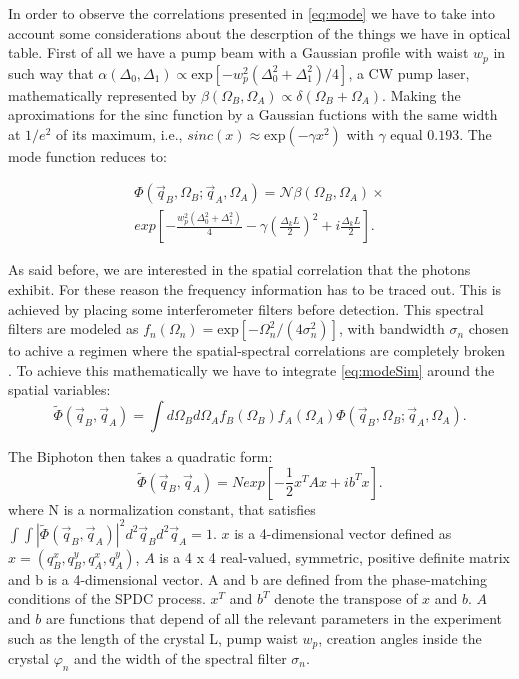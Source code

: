 In order to observe the correlations presented in \ref{eq:mode} we have to take into account some considerations about the descrption of the things we have in optical table.
First of all we have a pump beam with a Gaussian profile with waist $w_p$ 
in such way that $\alpha (\Delta_0,\Delta_1 ) \propto \text{exp}[-w_p^2 (\Delta_0^2 + \Delta_1^2 )/4]$, a CW pump laser, mathematically represented by
$\beta (\Omega_B , \Omega_A) \propto \delta(\Omega_B + \Omega_A)$. Making the aproximations for the sinc function by a Gaussian fuctions with the same width at $1/e^2$ of its maximum,
i.e., $sinc(x) \approx \text{exp}(-\gamma x^2)$ with $\gamma$ equal $0.193$.
The mode function reduces to:

\begin{equation}\label{eq:modeSim}
\begin{split}
\Phi(\vec{q}_B,\Omega_B;\vec{q}_A,\Omega_A) = \mathcal{N} \beta (\Omega_B , \Omega_A)
\times \\ \textit{exp}\left[ -\frac{w_p^2 (\Delta_0^2 + \Delta_1^2 )}{4}-\gamma \left(\frac{\Delta_k L}{2} \right)^2 + i\frac{\Delta_k L}{2} \right]  .
\end{split}
\end{equation}

As said before, we are interested in the spatial correlation that the photons 
exhibit. For these reason the frequency information has to be traced 
out. This is achieved by placing some interferometer filters before detection.
This spectral filters are modeled as $f_n (\Omega_n)=\text{exp}[-\Omega_n^2/(
4\sigma_n^2)]$, with bandwidth $\sigma_n$ chosen to achive a regimen where the 
spatial-spectral correlations are completely broken \cite{broke}. 
To achieve this mathematically we have to integrate \ref{eq:modeSim} around the
spatial variables:
\begin{equation}
\label{eq:modeSpa}
\tilde{\Phi}(\vec{q}_B,\vec{q}_A) = \int d\Omega_B d\Omega_A f_B(\Omega_B)f_A(\Omega_A) \Phi(\vec{q}_B,\Omega_B;\vec{q}_A,\Omega_A).
\end{equation}



The Biphoton then takes a quadratic form\cite{omar}:
\begin{equation}
\label{eq:quadratic}
\tilde{\Phi}(\vec{q}_B,\vec{q}_A)=N \textit{exp}\left[ -\frac{1}{2}x^T A x + i b^T x \right].
\end{equation}
where N is a normalization constant, that satisfies $\int \int | \tilde{\Phi}(\vec{q}_B,\vec{q}_A)|^2 d^2 \vec{q}_B d^2 \vec{q}_A = 1$. 
$x$ is a 4-dimensional vector defined as $x = (q^x_B, q^y_B ,q^x_A,q^y_A )$, $A$ 
is a 4 x 4 real-valued, symmetric, positive definite matrix and b is a 4-dimensional vector. 
A and b are defined from the phase-matching conditions of the SPDC process. $x^T$ and $b^T$ denote
 the transpose of $x$ and $b$. $A$ and $b$ are functions that depend of all the relevant 
parameters in the experiment such as the length of the crystal L, pump waist $w_p$, creation 
angles inside the crystal $\varphi_n$ and the width of the spectral filter $\sigma_n$.

